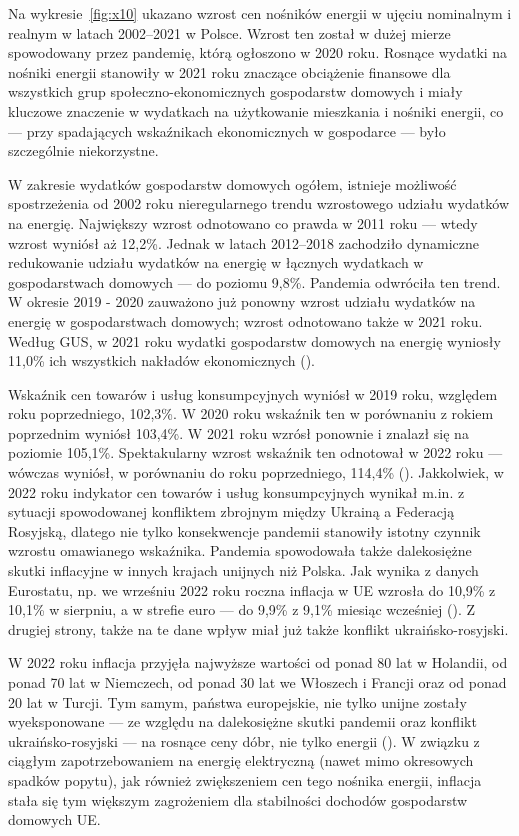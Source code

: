 \documentclass[polish, twoside, 12pt, a4paper]{article}
\theoremstyle{definition}
\theoremstyle{plain}
\theoremstyle{remark}
\begin{document}
Na wykresie~\ref{fig:x10} ukazano wzrost cen nośników energii w ujęciu nominalnym i realnym w latach 2002--2021 w Polsce. Wzrost ten został w dużej mierze spowodowany przez pandemię, którą ogłoszono w 2020 roku. Rosnące wydatki na nośniki energii stanowiły w 2021 roku znaczące obciążenie finansowe dla wszystkich grup społeczno-ekonomicznych gospodarstw domowych i miały kluczowe znaczenie w wydatkach na użytkowanie mieszkania i nośniki energii, co --- przy spadających wskaźnikach ekonomicznych w gospodarce --- było szczególnie niekorzystne. 

W zakresie wydatków gospodarstw domowych ogółem, istnieje możliwość spostrzeżenia od 2002 roku nieregularnego trendu wzrostowego udziału wydatków na energię. Największy wzrost odnotowano co prawda w 2011 roku --- wtedy wzrost wyniósł aż 12,2\%. Jednak w latach 2012--2018 zachodziło dynamiczne redukowanie udziału wydatków na energię w łącznych wydatkach w gospodarstwach domowych --- do poziomu 9,8\%. Pandemia odwróciła ten trend. W okresie 2019 - 2020 zauważono już ponowny wzrost udziału wydatków na energię w gospodarstwach domowych; wzrost odnotowano także w 2021 roku. Według GUS, w 2021 roku wydatki gospodarstw domowych na energię wyniosły 11,0\% ich wszystkich nakładów ekonomicznych (\cite{gus2023}). 

Wskaźnik cen towarów i usług konsumpcyjnych wyniósł w 2019 roku, względem roku poprzedniego, 102,3\%. W 2020 roku wskaźnik ten w porównaniu z rokiem poprzednim wyniósł 103,4\%. W 2021 roku wzrósł ponownie i znalazł się na poziomie 105,1\%. Spektakularny wzrost wskaźnik ten odnotował w 2022 roku --- wówczas wyniósł, w porównaniu do roku poprzedniego, 114,4\% (\cite{gus2023}). Jakkolwiek, w 2022 roku indykator cen towarów i usług konsumpcyjnych wynikał m.in. z sytuacji spowodowanej konfliktem zbrojnym między Ukrainą a Federacją Rosyjską, dlatego nie tylko konsekwencje pandemii stanowiły istotny czynnik wzrostu omawianego wskaźnika. Pandemia spowodowała także dalekosiężne skutki inflacyjne w innych krajach unijnych niż Polska. Jak wynika z danych Eurostatu, np. we wrześniu 2022 roku roczna inflacja w UE wzrosła do 10,9\% z 10,1\% w sierpniu, a w strefie euro --- do 9,9\% z 9,1\% miesiąc wcześniej (\cite{rp2022}). Z drugiej strony, także na te dane wpływ miał już także konflikt ukraińsko-rosyjski. 

W 2022 roku inflacja przyjęła najwyższe wartości od ponad 80 lat w Holandii, od ponad 70 lat w Niemczech, od ponad 30 lat we Włoszech i Francji oraz od ponad 20 lat w Turcji. Tym samym, państwa europejskie, nie tylko unijne zostały wyeksponowane --- ze względu na dalekosiężne skutki pandemii oraz konflikt ukraińsko-rosyjski --- na rosnące ceny dóbr, nie tylko energii (\cite{infor2022}). W związku z ciągłym zapotrzebowaniem na energię elektryczną (nawet mimo okresowych spadków popytu), jak również zwiększeniem cen tego nośnika energii, inflacja stała się tym większym zagrożeniem dla stabilności dochodów gospodarstw domowych UE. 
\end{document}
